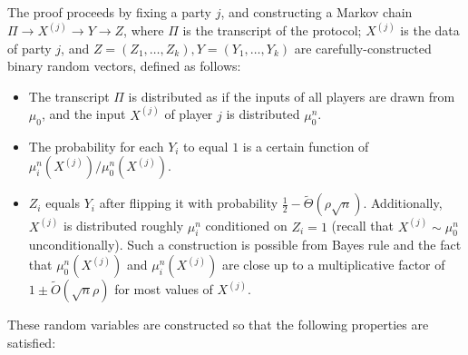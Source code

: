 \documentclass[final, 12pt]{colt2018}
\begin{document}
The proof proceeds by fixing a party $j$, and constructing a Markov chain
$\Pi \to X^{(j)} \to Y \to Z$, where $\Pi$ is the transcript of the protocol; $X^{(j)}$ is the data of party $j$, and $Z=(Z_1,\ldots,Z_k),Y=(Y_1,\ldots,Y_k)$ are carefully-constructed binary random vectors, defined as follows:
\begin{itemize}[leftmargin=*]
\item The transcript $\Pi$ is distributed as if the inputs of all players are drawn from $\mu_0$, and the input $X^{(j)}$ of player $j$ is distributed $\mu_0^n$.
\item The probability for each $Y_i$ to equal $1$ is a certain function of $\mu_i^n(X^{(j)})/\mu_0^n(X^{(j)})$.
\item $Z_i$ equals $Y_i$ after flipping it with probability $\frac{1}{2}-\tilde{\Theta}\left(\rho\sqrt{n}\right)$. Additionally, $X^{(j)}$ is distributed roughly $\mu_i^n$ conditioned on $Z_i=1$ (recall that $X^{(j)} \sim \mu_0^n$ unconditionally). Such a construction is possible from Bayes rule and the fact that $\mu_0^n(X^{(j)})$ and $\mu_i^n(X^{(j)})$ are close up to a multiplicative factor of $1 \pm \tilde{O}\left(\sqrt{n}\rho\right)$ for most values of $X^{(j)}$.
\end{itemize}
These random variables are constructed so that the following properties are satisfied:
\end{document}

